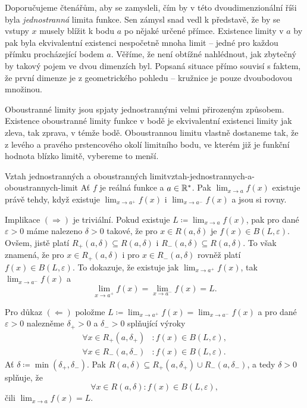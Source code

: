 Doporučujeme čtenářům, aby se zamysleli, čím by v této dvoudimenzionální říši
byla \emph{jednostranná} limita funkce. Sen zámysl snad vedl k představě, že by
se vstupy $x$ musely blížit k bodu $a$ po nějaké určené přímce. Existence
 limity v $a$ by pak byla ekvivalentní existenci nespočetně mnoha
 limit -- jedné pro každou přímku procházející bodem $a$.
Věříme, že není obtížné nahlédnout, jak zbytečný by takový pojem ve dvou
dimenzích byl. Popsaná situace přímo souvisí s faktem, že první dimenze je z
geometrického pohledu  -- kružnice je pouze dvoubodovou
množinou.

Oboustranné limity jsou spjaty jednostrannými velmi přirozeným způsobem.
Existence oboustran\-né limity funkce v bodě je ekvivalentní existenci limity
jak zleva, tak zprava, v témže bodě. Oboustrannou limitu vlastně dostaneme tak,
že z levého a pravého prstencového okolí limitního bodu, ve kterém již je
funkční hodnota blízko limitě, vybereme to menší.

\begin{proposition}{Vztah jednostranných a oboustranných
 limit}{vztah-jednostrannych-a-oboustrannych-limit}
 Ať $f$ je reálná funkce a $a \in \mathbb{R}^{*}$. Pak $\lim_{x \to a} f(x)$ existuje
 právě tehdy, když existuje $\lim_{x \to a^{+}} f(x)$ i $\lim_{x \to a^{-}}
 f(x)$ a jsou si rovny.
\end{proposition}

\begin{propproof}
 Implikace $( \Rightarrow )$ je triviální. Pokud existuje $L \coloneqq \lim_{x
 \to a} f(x)$, pak pro dané $\varepsilon>0$ máme nalezeno $\delta>0$ takové, že
 pro $x \in R(a,\delta)$ je $f(x) \in B(L,\varepsilon)$. Ovšem, jistě platí
 $R_+(a,\delta) \subseteq R(a,\delta)$ i $R_-(a,\delta) \subseteq R(a,\delta)$.
 To však znamená, že pro $x \in R_+(a,\delta)$ i pro $x \in R_-(a,\delta)$
 rovněž platí $f(x) \in B(L,\varepsilon)$. To dokazuje, že existuje jak $\lim_{x
 \to a^{+}} f(x)$, tak $\lim_{x \to a^{-}} f(x)$ a
 \[
  \lim_{x \to a^{+}} f(x) = \lim_{x \to a^{-}} f(x) = L.
 \]
 
 Pro důkaz $( \Leftarrow )$ položme $L \coloneqq \lim_{x \to a^{+}} f(x) =
 \lim_{x \to a^{-}} f(x)$ a pro dané $\varepsilon>0$ nalezněme $\delta_+>0$ a
 $\delta_- >0$ splňující výroky
 \begin{align*}
  \forall x \in R_+(a,\delta_+) &: f(x) \in B(L,\varepsilon),\\
  \forall x \in R_-(a,\delta_-) &: f(x) \in B(L,\varepsilon).
 \end{align*}
 Ať $\delta \coloneqq \min(\delta_+,\delta_-)$. Pak $R(a,\delta) \subseteq
 R_+(a,\delta_+) \cup R_-(a,\delta_-)$, a tedy $\delta>0$ splňuje, že
 \[
  \forall x \in R(a,\delta):f(x) \in B(L,\varepsilon),
 \]
 čili $\lim_{x \to a} f(x) = L$.
\end{propproof}

